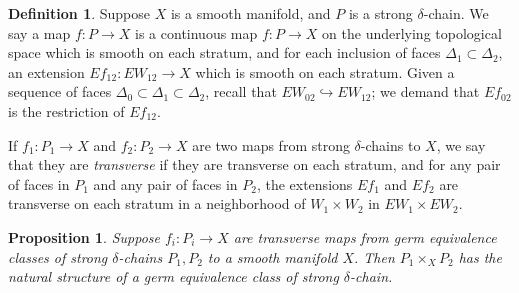 \documentclass[10pt,a4paper]{amsart}
\newtheorem{lemma}[theorem]{Lemma}
\newtheorem{proposition}[theorem]{Proposition}
\theoremstyle{definition}
\newtheorem{definition}[theorem]{Definition}
\theoremstyle{remark}
\numberwithin{figure}{qchap}
\begin{document}
\begin{definition}Suppose $X$ is a smooth manifold, and $P$ is a strong $\delta$-chain. We say a map $f: P \to X$ is a continuous map $f: P \to X$ on the underlying topological space which is smooth on each stratum, and for each inclusion of faces $\Delta_1 \subset \Delta_2$, an extension $Ef_{12}: EW_{12} \to X$ which is smooth on each stratum. Given a sequence of faces $\Delta_0 \subset \Delta_1 \subset \Delta_2$, recall that $EW_{02} \hookrightarrow EW_{12}$; we demand that $Ef_{02}$ is the restriction of $Ef_{12}$.

If $f_1: P_1 \to X$ and $f_2: P_2 \to X$ are two maps from strong $\delta$-chains to $X$, we say that they are \emph{transverse} if they are transverse on each stratum, and for any pair of faces in $P_1$ and any pair of faces in $P_2$, the extensions $Ef_1$ and $Ef_2$ are transverse on each stratum in a neighborhood of $W_1 \times W_2$ in $EW_1 \times EW_2$.

\end{definition}



\begin{proposition}Suppose $f_i: P_i \to X$ are transverse maps from germ equivalence classes of strong $\delta$-chains $P_1, P_2$ to a smooth manifold $X$. Then $P_1 \times_X P_2$ has the natural structure of a germ equivalence class of strong $\delta$-chain.
\end{proposition}
\end{document}
